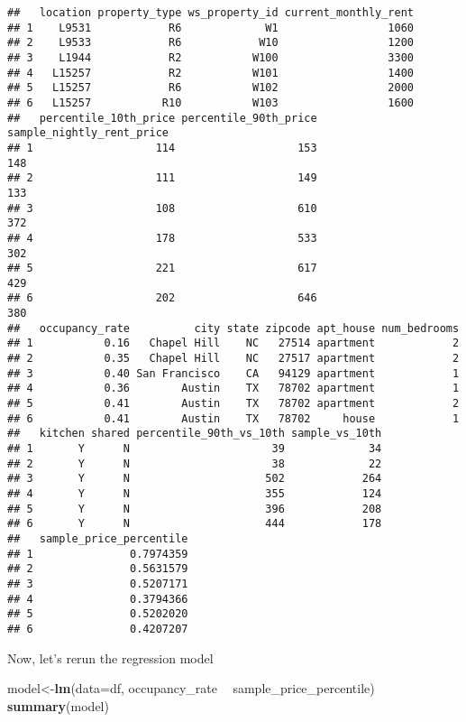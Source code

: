 \documentclass[]{article}
\newenvironment{Shaded}{\begin{snugshade}}{\end{snugshade}}
\newcommand{\DataTypeTok}[1]{\textcolor[rgb]{0.13,0.29,0.53}{#1}}
\newcommand{\KeywordTok}[1]{\textcolor[rgb]{0.13,0.29,0.53}{\textbf{#1}}}
\newcommand{\NormalTok}[1]{#1}
\newcommand{\OperatorTok}[1]{\textcolor[rgb]{0.81,0.36,0.00}{\textbf{#1}}}
\newcommand{\StringTok}[1]{\textcolor[rgb]{0.31,0.60,0.02}{#1}}
\begin{document}
\begin{verbatim}
##   location property_type ws_property_id current_monthly_rent
## 1    L9531            R6             W1                 1060
## 2    L9533            R6            W10                 1200
## 3    L1944            R2           W100                 3300
## 4   L15257            R2           W101                 1400
## 5   L15257            R6           W102                 2000
## 6   L15257           R10           W103                 1600
##   percentile_10th_price percentile_90th_price sample_nightly_rent_price
## 1                   114                   153                       148
## 2                   111                   149                       133
## 3                   108                   610                       372
## 4                   178                   533                       302
## 5                   221                   617                       429
## 6                   202                   646                       380
##   occupancy_rate          city state zipcode apt_house num_bedrooms
## 1           0.16   Chapel Hill    NC   27514 apartment            2
## 2           0.35   Chapel Hill    NC   27517 apartment            2
## 3           0.40 San Francisco    CA   94129 apartment            1
## 4           0.36        Austin    TX   78702 apartment            1
## 5           0.41        Austin    TX   78702 apartment            2
## 6           0.41        Austin    TX   78702     house            1
##   kitchen shared percentile_90th_vs_10th sample_vs_10th
## 1       Y      N                      39             34
## 2       Y      N                      38             22
## 3       Y      N                     502            264
## 4       Y      N                     355            124
## 5       Y      N                     396            208
## 6       Y      N                     444            178
##   sample_price_percentile
## 1               0.7974359
## 2               0.5631579
## 3               0.5207171
## 4               0.3794366
## 5               0.5202020
## 6               0.4207207
\end{verbatim}

Now, let's rerun the regression model

\begin{Shaded}
\begin{Highlighting}[]
\NormalTok{model<-}\KeywordTok{lm}\NormalTok{(}\DataTypeTok{data=}\NormalTok{df, occupancy_rate }\OperatorTok{~}\StringTok{ }\NormalTok{sample_price_percentile)}
\KeywordTok{summary}\NormalTok{(model)}
\end{Highlighting}
\end{Shaded}
\end{document}
